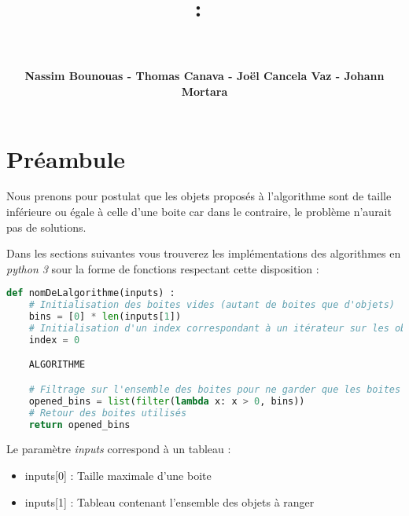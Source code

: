 \documentclass{article}
\title{
\vspace{2in}
\textmd{\textbf{\hmwkClass :\ \hmwkTitle}}\\
\vspace{0.2in}\Large{\textit{\ \hmwkDueDate}}
\vspace{3in}
}
\author{\textbf{Nassim Bounouas - Thomas Canava - Joël Cancela Vaz - Johann Mortara}}
\date{} %
\begin{document}
\maketitle



\newpage
{}
\tableofcontents
\newpage

\section{Préambule}
Nous prenons pour postulat que les objets proposés à l'algorithme sont de taille inférieure ou égale à celle d'une boite car dans le contraire, le problème n'aurait pas
de solutions.

Dans les sections suivantes vous trouverez les implémentations des algorithmes en \textit{python 3} sour la forme de fonctions respectant cette disposition :

\begin{lstlisting}[language=Python, frame=single]
def nomDeLalgorithme(inputs) :
    # Initialisation des boites vides (autant de boites que d'objets)
    bins = [0] * len(inputs[1])
    # Initialisation d'un index correspondant à un itérateur sur les objets
    index = 0

    ALGORITHME

    # Filtrage sur l'ensemble des boites pour ne garder que les boites utilisées
    opened_bins = list(filter(lambda x: x > 0, bins))
    # Retour des boites utilisés
    return opened_bins
\end{lstlisting}

Le paramètre \textit{inputs} correspond à un tableau :
    \begin{itemize}
        \item inputs[0] :  Taille maximale d'une boite
        \item inputs[1] :  Tableau contenant l'ensemble des objets à ranger
    \end{itemize}

\end{document}
